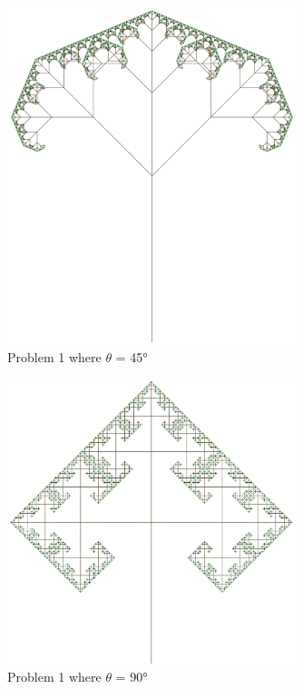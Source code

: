 \begin{figure}[H]
\centering
\noindent\includegraphics[width=0.75\textwidth]{figures/L-systems/prob1-45}
\caption{Problem 1 where $\theta$ = 45°}
\label{fig:prob1_45}
\end{figure}

\begin{figure}[H]
\centering
\noindent\includegraphics[width=0.75\textwidth]{figures/L-systems/prob1-90}
\caption{Problem 1 where $\theta$ = 90°}
\label{fig:prob1_90}
\end{figure}

